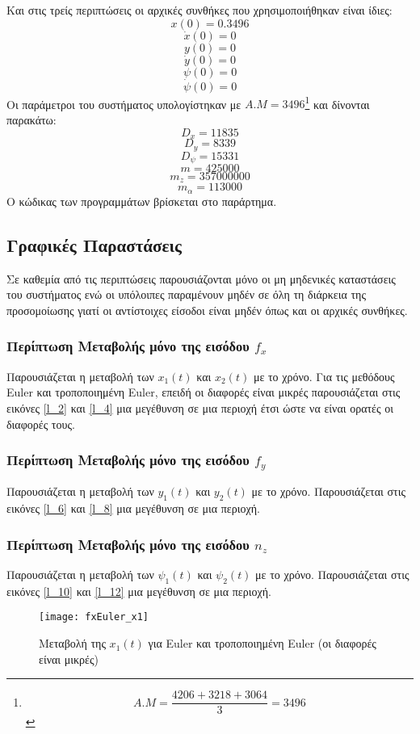 \documentclass{article}
\begin{document}
Και στις τρείς περιπτώσεις οι αρχικές συνθήκες που χρησιμοποιήθηκαν είναι ίδιες:
\[x(0) = 0.3496\]
\[\dot{x}(0) = 0\]
\[y(0) = 0\]
\[\dot{y}(0) = 0\]
\[\psi(0) = 0\]
\[\dot{\psi}(0) = 0\]
Οι παράμετροι του συστήματος υπολογίστηκαν με \(Α.Μ = 3496\)\footnote{\[A.M = \frac{4206 + 3218 + 3064}{3} = 3496\]} και δίνονται παρακάτω:
\[D_x = 11835\]
\[D_y = 8339\]
\[D_\psi = 15331\]
\[m = 425000\]
\[m_z = 357000000\]
\[m_\alpha = 113000\]
Ο κώδικας των προγραμμάτων βρίσκεται στο παράρτημα.

\subsection{Γραφικές Παραστάσεις}
Σε καθεμία από τις περιπτώσεις παρουσιάζονται μόνο οι μη μηδενικές καταστάσεις του συστήματος ενώ οι υπόλοιπες παραμένουν μηδέν σε όλη τη διάρκεια της προσομοίωσης γιατί οι αντίστοιχες είσοδοι είναι μηδέν όπως και οι αρχικές συνθήκες.
\subsubsection{Περίπτωση Μεταβολής μόνο της εισόδου \(f_x\)}
Παρουσιάζεται η μεταβολή των \(x_1(t)\) και \(x_2(t)\) με το χρόνο. Για τις μεθόδους Euler και τροποποιημένη Euler, επειδή οι διαφορές είναι μικρές παρουσιάζεται στις εικόνες \ref{l_2} και \ref{l_4} μια μεγέθυνση σε μια περιοχή έτσι ώστε να είναι ορατές οι διαφορές τους. 

\subsubsection{Περίπτωση Μεταβολής μόνο της εισόδου \(f_y\)}
Παρουσιάζεται η μεταβολή των \(y_1(t)\) και \(y_2(t)\) με το χρόνο. Παρουσιάζεται στις εικόνες \ref{l_6} και \ref{l_8} μια μεγέθυνση σε μια περιοχή.

\subsubsection{Περίπτωση Μεταβολής μόνο της εισόδου \(n_z\)}
Παρουσιάζεται η μεταβολή των \(\psi_1(t)\) και \(\psi_2(t)\) με το χρόνο. Παρουσιάζεται στις εικόνες \ref{l_10} και \ref{l_12} μια μεγέθυνση σε μια περιοχή.

\clearpage

\begin{figure}[bh!]
 \centering
\texttt{[image: fxEuler\_x1]}
\caption{Μεταβολή της $x_1(t)$ για Euler και τροποποιημένη
 Euler (οι διαφορές είναι μικρές)}
\end{figure}
\end{document}
